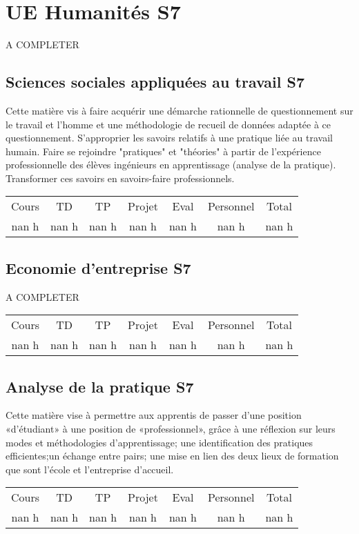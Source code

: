 \section{UE Humanités S7}%
\label{sec:UEHumanitsS7}%
A COMPLETER%
\subsection{Sciences sociales appliquées au travail S7}%
\label{subsec:SciencessocialesappliquesautravailS7}%

%
Cette matière vis à faire acquérir une démarche rationnelle de questionnement sur le travail et l'homme et une méthodologie de recueil de données adaptée à ce questionnement. S'approprier les savoirs relatifs à une pratique liée au travail humain. Faire se rejoindre "pratiques" et "théories" à partir de l'expérience professionnelle des élèves ingénieurs en apprentissage (analyse de la pratique). Transformer ces savoirs en savoirs{-}faire professionnels. %
\begin{longtable}{c c c c c c c}%
\hline%
Cours&TD&TP&Projet&Eval&Personnel&Total\\%
nan h&nan h&nan h&nan h&nan h&nan h&nan h\\%
\hline%
\end{longtable}%
\subsection{Economie d'entreprise S7}%
\label{subsec:EconomiedentrepriseS7}%

%
A COMPLETER%
\begin{longtable}{c c c c c c c}%
\hline%
Cours&TD&TP&Projet&Eval&Personnel&Total\\%
nan h&nan h&nan h&nan h&nan h&nan h&nan h\\%
\hline%
\end{longtable}%
\subsection{Analyse de la pratique S7}%
\label{subsec:AnalysedelapratiqueS7}%

%
Cette matière vise à permettre aux apprentis de passer d’une position «d’étudiant» à une position de «professionnel», grâce à une réflexion sur leurs modes et méthodologies d’apprentissage; une identification des pratiques efficientes;un échange entre pairs; une mise en lien des deux lieux de formation que sont l’école et l’entreprise d’accueil.%
\begin{longtable}{c c c c c c c}%
\hline%
Cours&TD&TP&Projet&Eval&Personnel&Total\\%
nan h&nan h&nan h&nan h&nan h&nan h&nan h\\%
\hline%
\end{longtable}%
